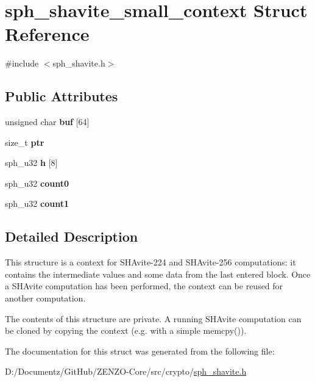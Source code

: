 \hypertarget{structsph__shavite__small__context}{}\section{sph\+\_\+shavite\+\_\+small\+\_\+context Struct Reference}
\label{structsph__shavite__small__context}


{\ttfamily \#include $<$sph\+\_\+shavite.\+h$>$}

\subsection*{Public Attributes}
\begin{DoxyCompactItemize}
\item 
\mbox{\label{structsph__shavite__small__context_ad74589c94e8c2dcb7a5aafdf0ca12d6b}} 
unsigned char {\bfseries buf} \mbox{[}64\mbox{]}
\item 
\mbox{\label{structsph__shavite__small__context_a6fce4cf25f61aa424d73d5eea7655f7f}} 
size\+\_\+t {\bfseries ptr}
\item 
\mbox{\label{structsph__shavite__small__context_a178c52fd8f4723c152891928cdf9428f}} 
sph\+\_\+u32 {\bfseries h} \mbox{[}8\mbox{]}
\item 
\mbox{\label{structsph__shavite__small__context_a61e5866a6d05a94f093df7bb0ba7e719}} 
sph\+\_\+u32 {\bfseries count0}
\item 
\mbox{\label{structsph__shavite__small__context_a19e4d2f46dcf6ac31d8cbde7f7aceeea}} 
sph\+\_\+u32 {\bfseries count1}
\end{DoxyCompactItemize}


\subsection{Detailed Description}
This structure is a context for S\+H\+Avite-\/224 and S\+H\+Avite-\/256 computations\+: it contains the intermediate values and some data from the last entered block. Once a S\+H\+Avite computation has been performed, the context can be reused for another computation.

The contents of this structure are private. A running S\+H\+Avite computation can be cloned by copying the context (e.\+g. with a simple {\ttfamily memcpy()}). 

The documentation for this struct was generated from the following file\+:\begin{DoxyCompactItemize}
\item 
D\+:/\+Documentz/\+Git\+Hub/\+Z\+E\+N\+Z\+O-\/\+Core/src/crypto/\mbox{\hyperlink{sph__shavite_8h}{sph\+\_\+shavite.\+h}}\end{DoxyCompactItemize}
